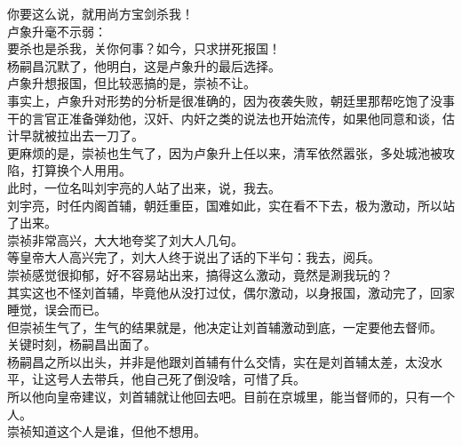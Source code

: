 \begin{multicols}{\theparacolNo}
你要这么说，就用尚方宝剑杀我！\\

卢象升毫不示弱：\\

要杀也是杀我，关你何事？如今，只求拼死报国！\\

杨嗣昌沉默了，他明白，这是卢象升的最后选择。\\

卢象升想报国，但比较恶搞的是，崇祯不让。\\

事实上，卢象升对形势的分析是很准确的，因为夜袭失败，朝廷里那帮吃饱了没事干的言官正准备弹劾他，汉奸、内奸之类的说法也开始流传，如果他同意和谈，估计早就被拉出去一刀了。\\

更麻烦的是，崇祯也生气了，因为卢象升上任以来，清军依然嚣张，多处城池被攻陷，打算换个人用用。\\

此时，一位名叫刘宇亮的人站了出来，说，我去。\\

刘宇亮，时任内阁首辅，朝廷重臣，国难如此，实在看不下去，极为激动，所以站了出来。\\

崇祯非常高兴，大大地夸奖了刘大人几句。\\

等皇帝大人高兴完了，刘大人终于说出了话的下半句：我去，阅兵。\\

崇祯感觉很抑郁，好不容易站出来，搞得这么激动，竟然是涮我玩的？\\

其实这也不怪刘首辅，毕竟他从没打过仗，偶尔激动，以身报国，激动完了，回家睡觉，误会而已。\\

但崇祯生气了，生气的结果就是，他决定让刘首辅激动到底，一定要他去督师。\\

关键时刻，杨嗣昌出面了。\\

杨嗣昌之所以出头，并非是他跟刘首辅有什么交情，实在是刘首辅太差，太没水平，让这号人去带兵，他自己死了倒没啥，可惜了兵。\\

所以他向皇帝建议，刘首辅就让他回去吧。目前在京城里，能当督师的，只有一个人。\\

崇祯知道这个人是谁，但他不想用。\\


\end{multicols}
